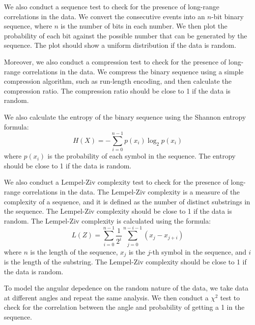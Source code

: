 We also conduct a sequence test to check for the presence of long-range correlations in the data. We convert the consecutive events into an $n$-bit binary sequence, where $n$ is the number of bits in each number. We then plot the probability of each bit against the possible number that can be generated by the sequence. The plot should show a uniform distribution if the data is random.

Moreover, we also conduct a compression test to check for the presence of long-range correlations in the data. We compress the binary sequence using a simple compression algorithm, such as run-length encoding, and then calculate the compression ratio. The compression ratio should be close to 1 if the data is random.

We also calculate the entropy of the binary sequence using the Shannon entropy formula:
\begin{equation}
H(X) = -\sum_{i=0}^{n-1} p(x_i) \log_2 p(x_i)
\end{equation}
where $p(x_i)$ is the probability of each symbol in the sequence. The entropy should be close to 1 if the data is random.

We also conduct a Lempel-Ziv complexity test to check for the presence of long-range correlations in the data. The Lempel-Ziv complexity is a measure of the complexity of a sequence, and it is defined as the number of distinct substrings in the sequence. The Lempel-Ziv complexity should be close to 1 if the data is random.
The Lempel-Ziv complexity is calculated using the formula:
\begin{equation}
L(Z) = \sum_{i=0}^{n-1} \frac{1}{2^i} \sum_{j=0}^{n-i-1} (x_j - x_{j+i})
\end{equation}
where $n$ is the length of the sequence, $x_j$ is the $j$-th symbol in the sequence, and $i$ is the length of the substring. The Lempel-Ziv complexity should be close to 1 if the data is random. 

To model the angular depedence on the random nature of the data, we take data at different angles and repeat the same analysis. We then conduct a $\chi^2$ test to check for the correlation between the angle and probability of getting a 1 in the sequence. 



